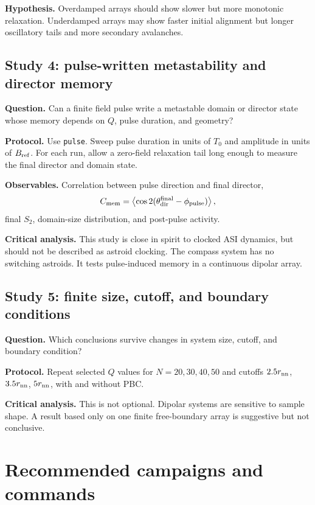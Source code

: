 \documentclass[11pt,a4paper]{article}
\newcommand{\code}[1]{\texttt{#1}}
\begin{document}
\textbf{Hypothesis.} Overdamped arrays should show slower but more monotonic relaxation. Underdamped arrays may show faster initial alignment but longer oscillatory tails and more secondary avalanches.

\subsection{Study 4: pulse-written metastability and director memory}

\textbf{Question.} Can a finite field pulse write a metastable domain or director state whose memory depends on $Q$, pulse duration, and geometry?

\textbf{Protocol.} Use \code{pulse}. Sweep pulse duration in units of $T_0$ and amplitude in units of $B_{\rm ref}$. For each run, allow a zero-field relaxation tail long enough to measure the final director and domain state.

\textbf{Observables.} Correlation between pulse direction and final director,
\begin{equation}
C_{\rm mem}=\left\langle \cos 2(\theta_{\rm dir}^{\rm final}-\phi_{\rm pulse})\right\rangle,
\end{equation}
final $S_2$, domain-size distribution, and post-pulse activity.

\textbf{Critical analysis.} This study is close in spirit to clocked ASI dynamics, but should not be described as astroid clocking. The compass system has no switching astroids. It tests pulse-induced memory in a continuous dipolar array.

\subsection{Study 5: finite size, cutoff, and boundary conditions}

\textbf{Question.} Which conclusions survive changes in system size, cutoff, and boundary condition?

\textbf{Protocol.} Repeat selected $Q$ values for $N=20,30,40,50$ and cutoffs $2.5r_{\rm nn}$, $3.5r_{\rm nn}$, $5r_{\rm nn}$, with and without PBC.

\textbf{Critical analysis.} This is not optional. Dipolar systems are sensitive to sample shape. A result based only on one finite free-boundary array is suggestive but not conclusive.

\section{Recommended campaigns and commands}
\label{sec:commands}
\end{document}
